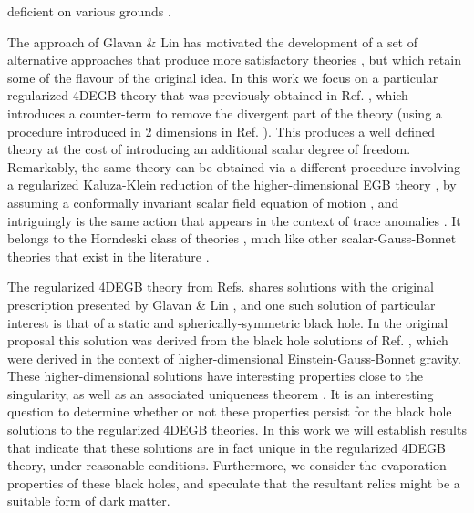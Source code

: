 \documentclass[reprint,amsmath,amssymbGaps,onecolumn,notitlepage,nofootinbib]{revtex4-1}
\begin{document}
deficient on various grounds \cite{Gurses:2020ofy,Gurses:2020rxb,Arrechea:2020evj,Arrechea:2020gjw,Bonifacio:2020vbk,Ai:2020peo,Mahapatra:2020rds,Hohmann:2020cor,Cao:2021nng}.

\par The approach of Glavan \& Lin has motivated the development of a set of alternative approaches that produce more satisfactory theories \cite{Lu:2020iav,Kobayashi:2020wqy,Mann:1992ar,Fernandes:2020nbq,Hennigar:2020lsl, Aoki:2020lig}, but which retain some of the flavour of the original idea. In this work we focus on a particular regularized 4DEGB theory that was previously obtained in Ref. \cite{Fernandes:2020nbq,Hennigar:2020lsl}, which introduces a counter-term to remove the divergent part of the theory (using a procedure introduced in 2 dimensions in Ref. \cite{Mann:1992ar}). This produces a well defined theory at the cost of introducing an additional scalar degree of freedom. Remarkably, the same theory can be obtained via a different procedure involving a regularized Kaluza-Klein reduction of the higher-dimensional EGB theory \cite{Lu:2020iav,Kobayashi:2020wqy}, by assuming a conformally invariant scalar field equation of motion \cite{Fernandes:2021dsb}, and intriguingly is the same action that appears in the context of trace anomalies \cite{Riegert:1984kt,Komargodski:2011vj}. It belongs to the Horndeski class of theories \cite{Horndeski}, much like other scalar-Gauss-Bonnet theories that exist in the literature \cite{Sotiriou:2013qea,Sotiriou:2014pfa,Saravani:2019xwx,Delgado:2020rev,Doneva:2017bvd,Silva:2017uqg,Antoniou:2017acq,Cunha:2019dwb,Collodel:2019kkx,Dima:2020yac,Herdeiro:2020wei,Berti:2020kgk,Kanti:1995vq,Kleihaus:2011tg,Kleihaus:2015aje,Cunha:2016wzk,Blazquez-Salcedo:2017txk,Nojiri:2005vv,Jiang:2013gza,Kanti:2015pda,Chakraborty:2018scm,Odintsov:2018zhw,Odintsov:2019clh,Odintsov:2020zkl,Kanti:1998jd}.

\par The regularized 4DEGB theory from Refs. \cite{Fernandes:2020nbq,Hennigar:2020lsl,Lu:2020iav,Kobayashi:2020wqy,Fernandes:2021dsb,Riegert:1984kt,Komargodski:2011vj} shares solutions with the original prescription presented by Glavan \& Lin \cite{Glavan:2019inb}, and one such solution of particular interest is that of a static and spherically-symmetric black hole. In the original proposal this solution was derived from the black hole solutions of Ref. \cite{BoulwareDeser,Wheeler:1985qd}, which were derived in the context of higher-dimensional Einstein-Gauss-Bonnet gravity. These higher-dimensional solutions have interesting properties close to the singularity, as well as an associated uniqueness theorem \cite{Cai:2001dz, Wiltshire:1985us,Wiltshire:1988uq}. It is an interesting question to determine whether or not these properties persist for the black hole solutions to the regularized 4DEGB theories. In this work we will establish results that indicate that these solutions are in fact unique in the regularized 4DEGB theory, under reasonable conditions. Furthermore, we consider the evaporation properties of these black holes, and speculate that the resultant relics might be a suitable form of dark matter.
\end{document}
